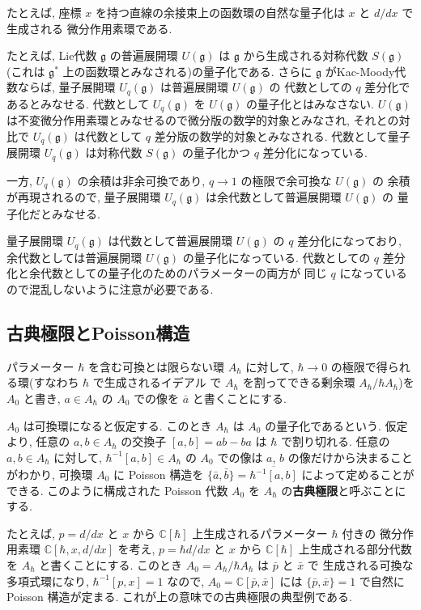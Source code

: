 \documentclass[12pt,twoside,dvipdfm]{msjproc}
\newcommand\C{{\mathbb C}} %
\theoremstyle{definition} %
\theoremstyle{definition} %
\theoremstyle{definition} %
\numberwithin{theorem}{section}
\numberwithin{equation}{section}
\numberwithin{figure}{section}
\numberwithin{table}{section}
\newcommand\g{\mathfrak{g}}
\begin{document}
たとえば, 座標 $x$ を持つ直線の余接束上の函数環の自然な量子化は $x$ と $d/dx$ で生成される
微分作用素環である. 

たとえば, Lie代数 $\g$ の普遍展開環 $U(\g)$ は $\g$ から生成される対称代数 $S(\g)$ 
(これは $\g^*$ 上の函数環とみなされる)の量子化である.
さらに $\g$ がKac-Moody代数ならば, 量子展開環 $U_q(\g)$ は普遍展開環 $U(\g)$ の
代数としての $q$ 差分化であるとみなせる.  
代数として $U_q(\g)$ を $U(\g)$ の量子化とはみなさない.
$U(\g)$ は不変微分作用素環とみなせるので微分版の数学的対象とみなされ,  
それとの対比で $U_q(\g)$ は代数として $q$ 差分版の数学的対象とみなされる.
代数として量子展開環 $U_q(\g)$ は対称代数 $S(\g)$ の量子化かつ $q$ 差分化になっている.

一方, $U_q(\g)$ の余積は非余可換であり, $q\to 1$ の極限で余可換な $U(\g)$ の
余積が再現されるので, 量子展開環 $U_q(\g)$ は余代数として普遍展開環 $U(\g)$ の
量子化だとみなせる.

量子展開環 $U_q(\g)$ は代数として普遍展開環 $U(\g)$ の $q$ 差分化になっており, 
余代数としては普遍展開環 $U(\g)$ の量子化になっている. 
代数としての $q$ 差分化と余代数としての量子化のためのパラメーターの両方が
同じ $q$ になっているので混乱しないように注意が必要である.




\subsection{古典極限とPoisson構造}
\label{sec:classical-limit}

パラメーター $\hbar$ を含む可換とは限らない環 $A_\hbar$ に対して, 
$\hbar\to 0$ の極限で得られる環(すなわち $\hbar$ で生成されるイデアル
で $A_\hbar$ を割ってできる剰余環 $A_\hbar/\hbar A_\hbar$)を $A_0$ と書き, 
$a\in A_\hbar$ の $A_0$ での像を $\bar{a}$ と書くことにする.

$A_0$ は可換環になると仮定する. 
このとき $A_\hbar$ は $A_0$ の量子化であるという.
仮定より, 任意の $a,b\in A_\hbar$ の交換子 $[a,b]=ab-ba$ は $\hbar$ で割り切れる.
任意の $a,b\in A_\hbar$ に対して,  
$\hbar^{-1}[a,b]\in A_\hbar$ の $A_0$ での像は $a$, $b$ の像だけから決まることがわかり, 
可換環 $A_0$ に Poisson 構造を
\(
 \{\bar{a}, \bar{b}\} = \overline{\hbar^{-1}[a,b]}
\)
によって定めることができる.
このように構成された Poisson 代数 $A_0$ を $A_\hbar$ の{\bf 古典極限}と呼ぶことにする.

たとえば, $p=d/dx$ と $x$ から $\C[\hbar]$ 上生成されるパラメーター $\hbar$ 付きの
微分作用素環 $\C[\hbar, x, d/dx]$ を考え, 
$p=\hbar d/dx$ と $x$ から $\C[\hbar]$ 上生成される部分代数を $A_\hbar$ と書くことにする.
このとき $A_0=A_\hbar/\hbar A_\hbar$ は $\bar{p}$ と $\bar{x}$ で
生成される可換な多項式環になり,  $\hbar^{-1}[p,x]=1$ なので, 
$A_0=\C[\bar{p},\bar{x}]$ には $\{\bar{p},\bar{x}\}=1$ で自然に Poisson 構造が定まる.
これが上の意味での古典極限の典型例である.  
\end{document}
